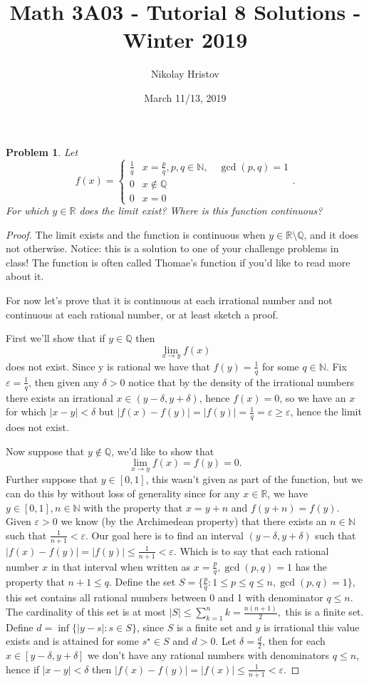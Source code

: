 \documentclass[11pt]{article}
\theoremstyle{plain}
\newtheorem{problem}{Problem}
\theoremstyle{remark}
\newcommand {\ds}{\displaystyle\sum}
\newcommand {\mbR} {\mathbb R}
\newcommand {\mbN} {\mathbb N}
\newcommand {\mbQ} {\mathbb Q}
\newcommand {\dlim}[2] {\displaystyle \lim_{#1 \rightarrow #2}}
\newcommand {\eps} {\varepsilon}
\newcommand {\del} {\delta}
\newcommand {\abs}[1]{\left| #1 \right|}
\newcommand {\pwii}[6] {\begin{cases} 
		#1 & #2 \\
		#3 & #4 \\
		#5 & #6
\end{cases}}
\begin{document}
	\title{Math 3A03 - Tutorial 8 Solutions - Winter 2019}
	\author{Nikolay Hristov}
	\date{March 11/13, 2019}
	\maketitle
	
	\begin{problem}
		Let \[f(x) = \pwii{\frac 1 q}{x=\frac p q,p,q\in\mbN, \quad\gcd(p,q)=1}{0}{x\notin \mbQ}{0}{x=0}.\] For which $y\in \mbR$ does the limit exist? Where is this function continuous?
	\end{problem}

\begin{proof}
	The limit exists and the function is continuous when $y\in \mbR\setminus \mbQ$, and it does not otherwise. Notice: this is a solution to one of your challenge problems in class! The function is often called Thomae's function if you'd like to read more about it.
	
	For now let's prove that it is continuous at each irrational number and not continuous at each rational number, or at least sketch a proof.
	
	First we'll show that if $y\in \mbQ$ then \[\dlim x y f(x)\] does not exist. Since y is rational we have that $f(y)=\frac 1 q$ for some $q\in \mbN$. Fix $\eps = \frac 1 q$, then given any $\del>0$ notice that by the density of the irrational numbers there exists an irrational $x\in (y-\del,y+\del)$, hence $f(x)=0$, so we have an $x$ for which $\abs{x-y}<\del$ but $\abs{f(x)-f(y)}=\abs{f(y)}=\frac 1 q = \eps\geq \eps$, hence the limit does not exist.
	
	Now suppose that $y\notin \mbQ$, we'd like to show that \[\dlim x y f(x)=f(y)=0.\] Further suppose that $y\in [0,1]$, this wasn't given as part of the function, but we can do this by without loss of generality since for any $x\in \mbR$, we have $y\in [0,1], n\in \mbN$ with the property that $x=y+n$ and $f(y+n)=f(y)$. Given $\eps>0$ we know (by the Archimedean property) that there exists an $n\in \mbN$ such that $\frac 1 {n+1} < \eps$. Our goal here is to find an interval $(y-\del,y+\del)$ such that $\abs{f(x)-f(y)}=\abs {f(y)}\leq \frac 1 {n+1} < \eps$. Which is to say that each rational number $x$ in that interval when written as $x=\frac p q, \gcd(p,q)=1$ has the property that $n+1\leq q.$ Define the set $S=\{\frac p q: 1\leq p\leq q \leq n,\gcd(p,q)=1\}$, this set contains all rational numbers between 0 and 1 with denominator $q\leq n.$
	The cardinality of this set is at most $|S|\leq \ds_{k=1}^n k = \frac {n(n+1)} 2,$ this is a finite set. Define $d=\inf\{|y-s|:s\in S\}$, since $S$ is a finite set and $y$ is irrational this value exists and is attained for some $s^\star \in S$ and $d>0$. Let $\del = \frac d 2$, then for each $x\in [y-\del,y+\del]$ we don't have any rational numbers with denominators $q\leq n$, hence if $|x-y|<\del$ then $\abs{f(x)-f(y)}=\abs{f(x)}\leq \frac 1 {n+1}<\eps$.
\end{proof}
\end{document}
